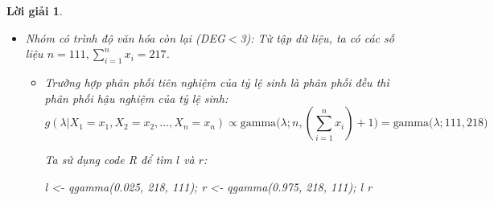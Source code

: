 \documentclass[14pt, a4paper]{article}
\theoremstyle{sltheorem}
\theoremstyle{soltheorem}
\newtheorem*{loigiai}{Lời giải}
\begin{document}
\begin{loigiai}
\begin{enumerate}
\begin{itemize}
\begin{itemize}
\begin{itemize}
                Ta sử dụng code R để tìm $l$ và $r$:

                \begin{python}
l <- qgamma(0.025, 67, 44);
r <- qgamma(0.975, 67, 44);
l
r
                \end{python}

                Ta thu được $l\approx 1.1801, r\approx1.9084$.
                Vậy khoảng tin cậy cho tỷ lệ sinh với độ tin cậy 0.95 là $(1.1801;1.9084)$.
                \item Trường hợp phân phối tiên nghiệm của tỷ lệ sinh là phân phối gamma $g(\lambda) = \text{gamma}(\lambda; r, \alpha)=\text{gamma}(\lambda; 2, 10)$ thì phân phối hậu nghiệm của tỷ lệ sinh là:
                \begin{equation*}
                    g(\lambda \vert X_1 =x_1, X_2=x_2, \dots, X_n=x_n) = \text{gamma}\big(\lambda; 46, 76 \big)
                \end{equation*}

                Ta sử dụng code R để tìm $l$ và $r$:

                \begin{python}
l <- qgamma(0.025, 76, 46);
r <- qgamma(0.975, 76, 46);
l
r
                \end{python}

                Ta thu được $l\approx 1.3017, r\approx2.0438$.
                Vậy khoảng tin cậy cho tỷ lệ sinh với độ tin cậy 0.95 là $(1.3017;2.0438)$.
            \end{itemize}
            \item Nhóm có trình độ văn hóa còn lại (DEG$<$3):
            Từ tập dữ liệu, ta có các số liệu $n=111, \sum_{i=1}^n x_i=217$.
            \begin{itemize}
                \item Trường hợp phân phối tiên nghiệm của tỷ lệ sinh là phân phối đều thì phân phối hậu nghiệm của tỷ lệ sinh:
                \begin{equation*}
                    g(\lambda \vert X_1 =x_1, X_2=x_2, \dots, X_n=x_n) \propto \text{gamma}\big(\lambda; n, (\sum_{i=1}^n x_i) + 1\big) = \text{gamma}\big(\lambda; 111, 218\big)
                \end{equation*}

                Ta sử dụng code R để tìm $l$ và $r$:

                \begin{python}
l <- qgamma(0.025, 218, 111);
r <- qgamma(0.975, 218, 111);
l
r
                \end{python}


\end{itemize}
\end{itemize}
\end{itemize}
\end{enumerate}
\end{loigiai}
\end{document}
